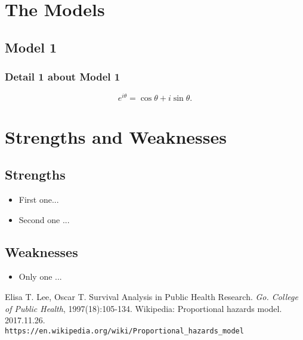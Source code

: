 \documentclass[12pt]{article}
\begin{document}
\section{The Models}
\subsection{Model 1}
\subsubsection{Detail 1 about Model 1}
\begin{equation}
    e^{i\theta}=\cos\theta+i\sin\theta.
\end{equation}

\section{Strengths and Weaknesses}
\subsection{Strengths}
\begin{itemize}
    \item First one...
    \item Second one ...
\end{itemize}

\subsection{Weaknesses}
\begin{itemize}
    \item Only one ...
 \end{itemize}

\begin{thebibliography}{99}
Elisa T. Lee, Oscar T. Survival Analysis in Public Health Research. \emph{Go. College of Public Health}, 1997(18):105-134.
Wikipedia: Proportional hazards model. 2017.11.26. \texttt{\\https://en.wikipedia.org/wiki/Proportional\_{}hazards\_{}model}
\end{thebibliography}
\end{document}
